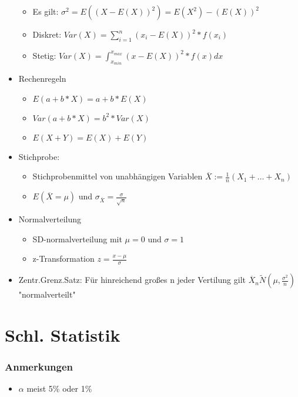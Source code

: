 \documentclass[a4paper]{article}
\begin{document}
\begin{landscape}
\begin{multicols}{4}
\begin{itemize}[noitemsep,nolistsep,leftmargin=*]
        \begin{itemize}[noitemsep,nolistsep,leftmargin=*]
            \item Es gilt: $\sigma^2 = E((X-E(X))^2) = E(X^2)- (E(X))^2$
            \item Diskret: $Var(X) = \sum^n_{i=1} (x_i-E(X))^2 * f(x_i)$
            \item Stetig: $Var(X) = \int^{x_{max}}_{x_{min}} (x-E(X))^2 * f(x) dx$
        \end{itemize}
        \item Rechenregeln
        \begin{itemize}[noitemsep,nolistsep,leftmargin=*]
            \item $E(a+b*X) = a + b* E(X)$
            \item $Var(a+b*X) = b^2 * Var(X)$
            \item $E(X+Y) = E(X) + E(Y)$
        \end{itemize}
        \item Stichprobe:
        \begin{itemize}[noitemsep,nolistsep,leftmargin=*]
            \item Stichprobenmittel von unabhängigen Variablen $\overline{X} := \frac{1}{n} (X_1 + \dots + X_n)$
            \item $E(\overline{X} = \mu)$ und $\sigma_{\overline{X}} = \frac{\sigma}{\sqrt{n}}$
        \end{itemize}
        \item Normalverteilung
        \begin{itemize}[noitemsep,nolistsep,leftmargin=*]
            \item SD-normalverteilung mit $\mu = 0$ und $\sigma = 1$
            \item z-Transformation $z = \frac{x-\mu}{\sigma}$
        \end{itemize}
        \item Zentr.Grenz.Satz: Für hinreichend großes n jeder Vertilung gilt $\overline{X}_n \tilde N(\mu, \frac{\sigma^2}{n}) $ "normalverteilt"
    \end{itemize}
    \section{Schl. Statistik}
        \subsubsection*{Anmerkungen}
        \begin{itemize}[noitemsep,nolistsep,leftmargin=*]
            \item $\alpha$ meist 5\% oder 1\%
        \end{itemize}

\end{multicols}
\end{landscape}
\end{document}
